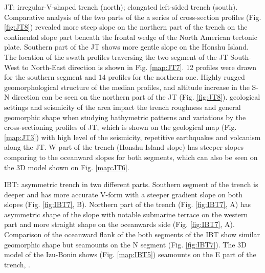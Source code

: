 \documentclass[11pt,a4paper]{report}
\begin{document}
{\ac{JT}: irregular-V-shaped trench (north); elongated left-sided trench (south). Comparative analysis of the two parts of the a series of cross-section profiles (Fig. \ref{fig:JT8}) revealed more steep slope on the northern part of the trench on the continental slope part beneath the frontal wedge of the North American tectonic plate. Southern part of the \ac{JT} shows more gentle slope on the Honshu Island. The location of the swath profiles traversing the two segment of the \ac{JT} South-West to North-East direction is shown in Fig. \ref{map:JT7}. 12 profiles were drawn for the southern segment and 14 profiles for the northern one. Highly rugged geomorphological structure of the median profiles, and altitude increase in the S-N direction can be seen on the northern part of the \ac{JT} (Fig. \ref{fig:JT8}). geological settings and seismicity of the area impact the trench roughness and general geomorphic shape when studying bathymetric patterns and variations by the cross-sectioning profiles of \ac{JT}, which is shown on the geological map (Fig. \ref{map:JT3}) with high level of the seismicity, repetitive earthquakes and volcanism along the \ac{JT}. W part of the trench (Honshu Island slope) has steeper slopes comparing to the oceanward slopes for both segments, which can also be seen on the 3D model shown on Fig. \ref{map:JT6}. 

\ac{IBT}: asymmetric trench in two different parts. Southern segment of the trench is deeper and has more accurate V-form with a steeper gradient slope on both slopes (Fig. \ref{fig:IBT7}, B). Northern part of the trench (Fig. \ref{fig:IBT7}, A) has asymmetric shape of the slope with notable submarine terrace on the western part and more straight shape on the oceanwards side (Fig. \ref{fig:IBT7}, A). Comparison of the oceanward flank of the both segments of the \ac{IBT} show similar geomorphic shape but seamounts on the N segment (Fig. \ref{fig:IBT7}). The 3D model of the Izu-Bonin shows (Fig. \ref{map:IBT5}) seamounts on the E part of the trench, \cite{Lemenkova202005}.

}
\end{document}
